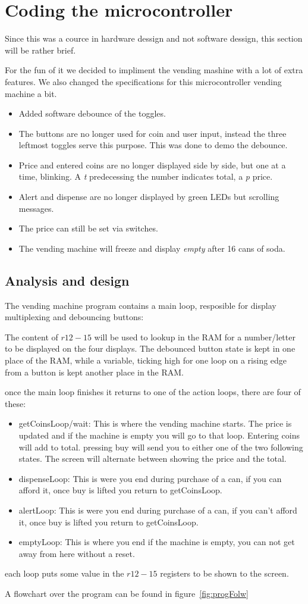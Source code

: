 \section{Coding the microcontroller}
Since this was a cource in hardware dessign and not software dessign, this
section will be rather brief.

For the fun of it we decided to impliment the vending mashine with a lot of
extra features. We also changed the specifications for this microcontroller
vending machine a bit.
\begin{itemize}
  \item Added software debounce of the toggles.
  \item The buttons are no longer used for coin and user input,
  instead the three leftmost toggles serve this purpose. This was done to demo
  the debounce.
  \item Price and entered coins are no longer displayed side by side, but one at
  a time, blinking. A \emph{t} predecessing the number indicates total, a
  \emph{p} price.
  \item Alert and dispense are no longer displayed by green LEDs but scrolling
  messages.
  \item The price can still be set via switches.
  \item The vending machine will freeze and display \emph{empty} after 16 cans
  of soda.
\end{itemize}

\subsection{Analysis and design}
The vending machine program contains a main loop,
resposible for display multiplexing and debouncing buttons:

The content of $r12-15$ will be used to lookup in the RAM for a number/letter to
be displayed on the four displays.
The debounced button state is kept in one place of the RAM,
while a variable, ticking high for one loop on a rising edge from a button is
kept another place in the RAM.

once the main loop finishes it returns to one of the action loops,
there are four of these:
\begin{itemize}
  \item getCoinsLoop/wait: This is where the vending machine starts.
  The price is updated and if the machine is empty you will go to that loop.
   Entering coins will add to total. pressing buy will send you to either one of the two
  following states. The screen will alternate between showing the price and the
  total.
  \item dispenseLoop: This is were you end during purchase of a can, if you can
  afford it, once buy is lifted you return to getCoinsLoop.
  \item alertLoop: This is were you end during purchase of a can, if you can't
  afford it, once buy is lifted you return to getCoinsLoop.
  \item emptyLoop: This is where you end if the machine is empty, you can not
  get away from here without a reset.
\end{itemize}
each loop puts some value in the $r12-15$ registers to be shown to the screen.

A flowchart over the program can be found in figure~\ref{fig:progFolw}
